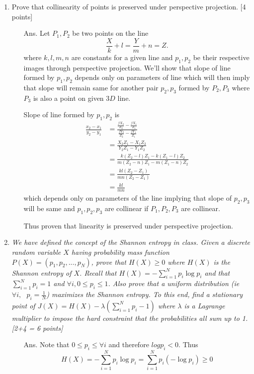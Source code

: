 \documentclass[11pt]{article}
\begin{document}
\begin{enumerate}
\item Prove that collinearity of points is preserved under perspective projection. \textsf{[4 points]} 

\begin{itemize}
\item[Ans.] Let $P_1,P_2$ be two points on the line \[
\frac{X}{k}+l = \frac{Y}{m}+n = Z.
\]
where $k,l,m,n$ are constants for a given line and $p_1,p_2$ be their respective images through perspective projection.
 We'll show that slope of line formed by $p_1,p_2$ depends only on parameters of line which will then imply that slope will remain same for another pair $p_2,p_3$ formed by $P_2,P_3$ where $P_3$ is also a point on given $3D$ line. 


Slope of line formed by $p_1,p_2$ is 
\begin{align}
\frac{x_2-x_1}{y_2-y_1} &= \frac{\frac{f X_2}{Z_2}-\frac{f X_1}{Z_1}}{\frac{f Y_2}{Z_2}-\frac{f Y_1}{Z_1}} \\ 
 &= \frac{X_2 Z_1 - X_1 Z_2}{Y_2 Z_1 - Y_1 Z_2} \\ 
 &= \frac{k(Z_2-l)Z_1 - k(Z_1-l)Z_2}{m(Z_2-n)Z_1 - m(Z_1-n)Z_2}\\
 &= \frac{kl(Z_2-Z_1)}{mn(Z_2-Z_1)}\\
 &= \frac{kl}{mn}
\end{align}
which depends only on parameters of the line implying that slope of $p_2,p_3$ will be same and $p_1,p_2,p_3$ are collinear if $P_1,P_2,P_3$ are collinear.

Thus proven that linearity is preserved under perspective projection.
\end{itemize}

\item \textit{We have defined the concept of the Shannon entropy in class. Given a discrete random variable $X$ having probability mass function $P(X) = (p_1, p_2, ..., p_N)$, prove that $H(X) \geq 0$ where $H(X)$ is the Shannon entropy of $X$. Recall that $H(X) = -\sum\limits_{i=1}^N p_i \log p_i$ and that $\sum\limits_{i=1}^N p_i = 1$ and $\forall i, 0 \leq p_i \leq 1$. Also prove that a uniform distribution (\textit{ie} $\forall i, \textrm{ } p_i = \frac{1}{N}$) maximizes the Shannon entropy. To this end, find a stationary point of $J(X) = H(X) - \lambda (\sum\limits_{i=1}^N p_i - 1)$ where $\lambda$ is a Lagrange multiplier to impose the hard constraint that the probabilities all sum up to 1.  \textsf{[2+4 = 6 points]}}

\begin{itemize}
\item[Ans.] Note that $0 \leq p_i \leq  \forall i$ and therefore $log p_i<0$. Thus  \[
H(X) = -\sum\limits_{i=1}^N p_i \log p_i
 = \sum\limits_{i=1}^N p_i (-\log p_i)
 \geq 0
\]


\end{itemize}
\end{enumerate}
\end{document}
